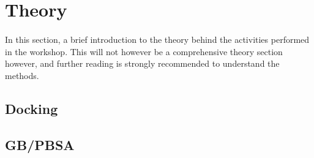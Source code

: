 \section{Theory}
    \paragraph{}
    In this section, a brief introduction to the theory behind the activities performed in the workshop. This will not however be a comprehensive theory section however, and further reading is strongly recommended to understand the methods.



\subsection{Docking}

\subsection{GB/PBSA}\label{subsection:pbsa-theory}